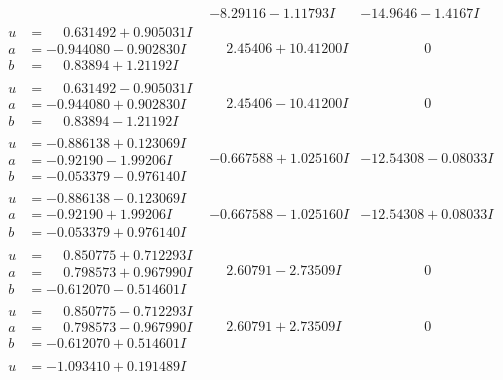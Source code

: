\documentclass[1p]{elsarticle_modified}
\theoremstyle{definition}
\begin{document}
$$\begin{array}{c|c|c}
 & -8.29116 - 1.11793 I & -14.9646 - 1.4167 I \\ \hline\begin{aligned}
u &= \phantom{-}0.631492 + 0.905031 I \\
a &= -0.944080 - 0.902830 I \\
b &= \phantom{-}0.83894 + 1.21192 I\end{aligned}
 & \phantom{-}2.45406 + 10.41200 I & \phantom{-0.000000 } 0 \\ \hline\begin{aligned}
u &= \phantom{-}0.631492 - 0.905031 I \\
a &= -0.944080 + 0.902830 I \\
b &= \phantom{-}0.83894 - 1.21192 I\end{aligned}
 & \phantom{-}2.45406 - 10.41200 I & \phantom{-0.000000 } 0 \\ \hline\begin{aligned}
u &= -0.886138 + 0.123069 I \\
a &= -0.92190 - 1.99206 I \\
b &= -0.053379 - 0.976140 I\end{aligned}
 & -0.667588 + 1.025160 I & -12.54308 - 0.08033 I \\ \hline\begin{aligned}
u &= -0.886138 - 0.123069 I \\
a &= -0.92190 + 1.99206 I \\
b &= -0.053379 + 0.976140 I\end{aligned}
 & -0.667588 - 1.025160 I & -12.54308 + 0.08033 I \\ \hline\begin{aligned}
u &= \phantom{-}0.850775 + 0.712293 I \\
a &= \phantom{-}0.798573 + 0.967990 I \\
b &= -0.612070 - 0.514601 I\end{aligned}
 & \phantom{-}2.60791 - 2.73509 I & \phantom{-0.000000 } 0 \\ \hline\begin{aligned}
u &= \phantom{-}0.850775 - 0.712293 I \\
a &= \phantom{-}0.798573 - 0.967990 I \\
b &= -0.612070 + 0.514601 I\end{aligned}
 & \phantom{-}2.60791 + 2.73509 I & \phantom{-0.000000 } 0 \\ \hline\begin{aligned}
u &= -1.093410 + 0.191489 I \\

\end{aligned}
\end{array}$$
\end{document}
